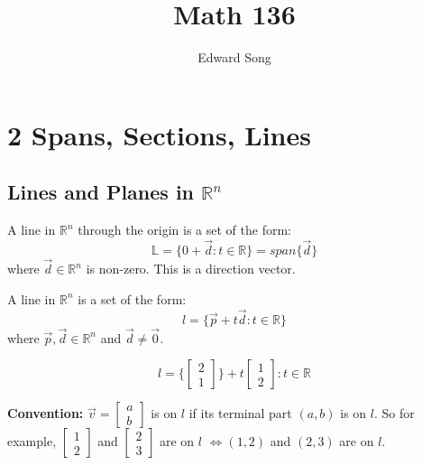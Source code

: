 \documentclass[11pt]{article}
\title{Math 136}
\author{Edward Song}
\theoremstyle{plain}
\theoremstyle{remark}
\theoremstyle{plain}
\newcommand{\bd}{\textbf}
\newcommand{\rn}{\mathbb{R}}
\begin{document}
\section*{2 Spans, Sections, Lines}


   

\subsection*{Lines and Planes in $\rn^n$}

\begin{tcolorbox}[colback=green!5!white,colframe=green!75!black,title=Definition: Recall]
  A line in $\rn^n$ through the origin is a set of the form:
  \[\mathbb{L}=\{0+\overrightarrow{d}:t\in \rn\}=span\{\overrightarrow{d}\}\]
  where $\overrightarrow{d}\in\rn^n$ is non-zero. This is a direction vector.
\end{tcolorbox}   

\begin{tcolorbox}[colback=green!5!white,colframe=green!75!black,title=Example ]
    A line in $\rn^n$ is a set of the form: \[l=\{\overrightarrow{p}+t\overrightarrow{d}:t\in\rn\}\]
    where $\overrightarrow{p},\overrightarrow{d}\in\rn^n$ and $\overrightarrow{d}\neq \overrightarrow{0}$.
\end{tcolorbox}   

\begin{tcolorbox}[colback=magenta!5!white,colframe=magenta!75!black,title=Example ]
    \[l=\{\begin{bmatrix}
        2\\1
    \end{bmatrix}\}+t\begin{bmatrix}
        1\\2
    \end{bmatrix}:t\in\rn\]
\end{tcolorbox}   

\bd{Convention:} $\overrightarrow{v}=\begin{bmatrix}
    a\\b
\end{bmatrix}$ is on $l$ if its terminal part $(a,b)$ is on $l$. So for example, $\begin{bmatrix}
    1\\2
\end{bmatrix}$ and $\begin{bmatrix}
    2\\3
\end{bmatrix}$ are on $l$ $\iff (1,2)$ and $(2,3)$ are on $l$. 
\end{document}
